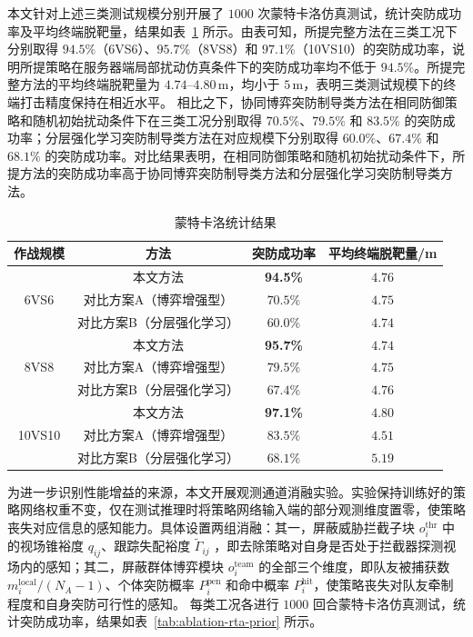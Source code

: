 本文针对上述三类测试规模分别开展了 $1000$ 次蒙特卡洛仿真测试，统计突防成功率及平均终端脱靶量，结果如表~\ref{tab:mc-stat} 所示。由表可知，所提完整方法在三类工况下分别取得 $94.5\%$（6VS6）、$95.7\%$（8VS8）和 $97.1\%$（10VS10）的突防成功率，说明所提策略在服务器端局部扰动仿真条件下的突防成功率均不低于 $94.5\%$。所提完整方法的平均终端脱靶量为 $4.74$--$4.80\,\mathrm{m}$，均小于 $5\,\mathrm{m}$，表明三类测试规模下的终端打击精度保持在相近水平。
相比之下，协同博弈突防制导类方法\cite{Chen2024CJA,Chen2024TAES}在相同防御策略和随机初始扰动条件下在三类工况分别取得 $70.5\%$、$79.5\%$ 和 $83.5\%$ 的突防成功率；分层强化学习突防制导类方法\cite{Hui2025CJA}在对应规模下分别取得 $60.0\%$、$67.4\%$ 和 $68.1\%$ 的突防成功率。对比结果表明，在相同防御策略和随机初始扰动条件下，所提方法的突防成功率高于协同博弈突防制导类方法和分层强化学习突防制导类方法。


\begin{table}[H]
  \centering
  \caption{蒙特卡洛统计结果}
  \label{tab:mc-stat}
  \begin{tabular}{cccc}
    \toprule
    作战规模 & 方法 & 突防成功率 & 平均终端脱靶量/m  \\
    \midrule
    \multirow{3}{*}{6VS6} & 本文方法 & \textbf{94.5\%} & $4.76$  \\
    & 对比方案A（博弈增强型） & $70.5\%$ & $4.75$  \\
    & 对比方案B（分层强化学习） & $60.0\%$ & $4.74$  \\
    \midrule
    \multirow{3}{*}{8VS8} & 本文方法 & \textbf{95.7\%} & $4.74$  \\
    & 对比方案A（博弈增强型） & $79.5\%$ & $4.75$  \\
    & 对比方案B（分层强化学习） & $67.4\%$ & $4.76$  \\
    \midrule
    \multirow{3}{*}{10VS10} & 本文方法 & \textbf{97.1\%} & $4.80$  \\
    & 对比方案A（博弈增强型） & $83.5\%$ & $4.51$  \\
    & 对比方案B（分层强化学习） & $68.1\%$ & $5.19$  \\
    \bottomrule
  \end{tabular}
\end{table}


为进一步识别性能增益的来源，本文开展观测通道消融实验。实验保持训练好的策略网络权重不变，仅在测试推理时将策略网络输入端的部分观测维度置零，使策略丧失对应信息的感知能力。具体设置两组消融：其一，屏蔽威胁拦截子块 $o_i^{\mathrm{thr}}$ 中的视场锥裕度 $q_{ij}$、跟踪失配裕度 $\tilde\Gamma_{ij}$ ，即去除策略对自身是否处于拦截器探测视场内的感知；其二，屏蔽群体博弈模块 $o_i^{\mathrm{team}}$ 的全部三个维度，即队友被捕获数 $m_i^{\mathrm{local}}/(N_A-1)$、个体突防概率 $P_i^{\mathrm{pen}}$ 和命中概率 $P_i^{\mathrm{hit}}$，使策略丧失对队友牵制程度和自身突防可行性的感知。
每类工况各进行 $1000$ 回合蒙特卡洛仿真测试，统计突防成功率，结果如表~\ref{tab:ablation-rta-prior} 所示。

